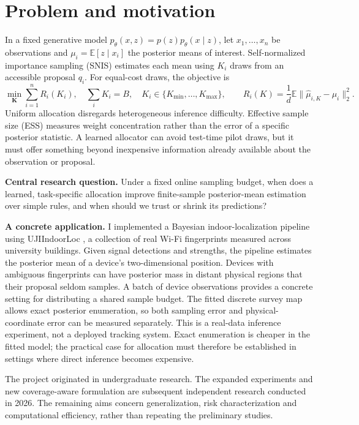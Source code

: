 \documentclass[10pt,letterpaper]{article}
\newcommand{\E}{\mathbb E}
\newcommand{\norm}[1]{\lVert #1\rVert_2}
\begin{document}
\section{Problem and motivation}
In a fixed generative model $p_\theta(x,z)=p(z)p_\theta(x\mid z)$, let $x_1,\ldots,x_n$ be observations and $\mu_i=\E[z\mid x_i]$ the posterior means of interest. Self-normalized importance sampling (SNIS) estimates each mean using $K_i$ draws from an accessible proposal $q_i$. For equal-cost draws, the objective is
\begin{equation}
 \min_{\mathbf K}\sum_{i=1}^n R_i(K_i),\quad \sum_i K_i=B,\quad K_i\in\{K_{\min},\ldots,K_{\max}\},\qquad
 R_i(K)=\frac1d\E\norm{\widehat\mu_{i,K}-\mu_i}^2.\label{eq:finiteobj}
\end{equation}
Uniform allocation disregards heterogeneous inference difficulty. Effective sample size (ESS) measures weight concentration rather than the error of a specific posterior statistic. A learned allocator can avoid test-time pilot draws, but it must offer something beyond inexpensive information already available about the observation or proposal.

\textbf{Central research question.} Under a fixed online sampling budget, when does a learned, task-specific allocation improve finite-sample posterior-mean estimation over simple rules, and when should we trust or shrink its predictions?

\textbf{A concrete application.} I implemented a Bayesian indoor-localization pipeline using UJIIndoorLoc \cite{uji2014}, a collection of real Wi-Fi fingerprints measured across university buildings. Given signal detections and strengths, the pipeline estimates the posterior mean of a device's two-dimensional position. Devices with ambiguous fingerprints can have posterior mass in distant physical regions that their proposal seldom samples. A batch of device observations provides a concrete setting for distributing a shared sample budget. The fitted discrete survey map allows exact posterior enumeration, so both sampling error and physical-coordinate error can be measured separately. This is a real-data inference experiment, not a deployed tracking system. Exact enumeration is cheaper in the fitted model; the practical case for allocation must therefore be established in settings where direct inference becomes expensive.

The project originated in undergraduate research. The expanded experiments and new coverage-aware formulation are subsequent independent research conducted in 2026. The remaining aims concern generalization, risk characterization and computational efficiency, rather than repeating the preliminary studies.
\end{document}
